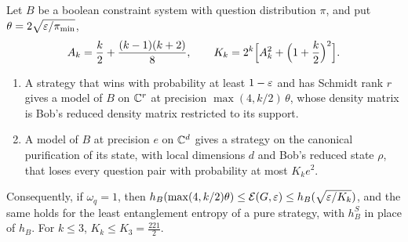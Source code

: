 \begin{theorem}\label{thm:boolean-correspondence}
Let $B$ be a boolean constraint system with question distribution $\pi$, and put $\theta=2\sqrt{\varepsilon/\pi_{\min}}$,
\[
A_k=\frac k2+\frac{(k-1)(k+2)}8,\qquad K_k=2^k\Bigl[A_k^2+\Bigl(1+\frac k2\Bigr)^2\Bigr].
\]
\begin{enumerate}[label=(\alph*),itemsep=1pt]
\item A strategy that wins with probability at least $1-\varepsilon$ and has Schmidt rank $r$ gives a model of $B$ on $\mathbb C^r$ at
precision $\max(4,k/2)\,\theta$, whose density matrix is Bob's reduced density matrix restricted to its support.
\item A model of $B$ at precision $e$ on $\mathbb C^d$ gives a strategy on the canonical purification of its state, with local
dimensions $d$ and Bob's reduced state $\rho$, that loses every question pair with probability at most $K_ke^2$.
\end{enumerate}
Consequently, if $\omega_q=1$, then $h_B(\max(4,k/2)\theta)\le\mathcal E(G,\varepsilon)\le h_B(\sqrt{\varepsilon/K_k})$, and the same holds
for the least entanglement entropy of a pure strategy, with $h^S_B$ in place of $h_B$. For $k\le3$, $K_k\le K_3=\frac{221}2$.
\end{theorem}


